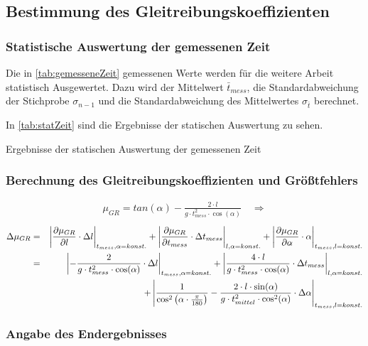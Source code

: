 \subsection{Bestimmung des Gleitreibungskoeffizienten}

\subsubsection{Statistische Auswertung der gemessenen Zeit}

Die in \autoref{tab:gemesseneZeit} gemessenen Werte werden für die weitere Arbeit statistisch Ausgewertet. Dazu wird der Mittelwert $\bar{t}_{mess}$, die Standardabweichung der Stichprobe $\sigma_{n-1}$ und die Standardabweichung des Mittelwertes $\sigma_{\bar{t}}$ berechnet.

In \autoref{tab:statZeit} sind die Ergebnisse der statischen Auswertung zu sehen.

\begin{table}[h]
    \center 
    \caption[Statistische Auswertung der gemessenen Zeit]{Ergebnisse der statischen Auswertung der gemessenen Zeit}
    
    \label{tab:statZeit}
\end{table}

\subsubsection{Berechnung des Gleitreibungskoeffizienten und Größtfehlers}

\begin{align}
  \mu_{GR} = tan(\alpha) - \frac{2 \cdot l}{g \cdot t_{mess}^2 \cdot \cos(\alpha)} \quad \Rightarrow
\end{align}
\begin{equation}
  \begin{alignedat}{2}
    \Delta \mu_{GR} &= &\quad \abs*{\frac{\partial \mu_{GR}}{\partial l} \cdot \Delta l}_{t_{mess},\alpha = konst.} + \abs*{\frac{\partial \mu_{GR}}{\partial t_{mess}} \cdot \Delta t_{mess}}_{l,\alpha = konst.} + \abs*{\frac{\partial \mu_{GR}}{\partial \alpha} \cdot \alpha}_{t_{mess},l = konst.}\\
    &= &\, \abs*{-\frac{2}{g \cdot t_{mess}^2 \cdot \cos(\alpha)}\cdot \Delta l}_{t_{mess},\alpha = konst.} + \abs*{\frac{4 \cdot l}{g \cdot t_{mess}^2 \cdot \cos(\alpha)} \cdot \Delta t_{mess}}_{l,\alpha = konst.} \\ 
    &\quad  &+ \, \abs*{\frac{1}{\cos^2\left( \alpha \cdot  \frac{\pi}{180} \right)} -\frac{2 \cdot l \cdot \sin(\alpha)}{g \cdot t_{mittel}^2 \cdot \cos^2(\alpha)} \cdot \Delta \alpha}_{t_{mess},l = konst.}
  \end{alignedat}
\end{equation}

\subsubsection{Angabe des Endergebnisses}